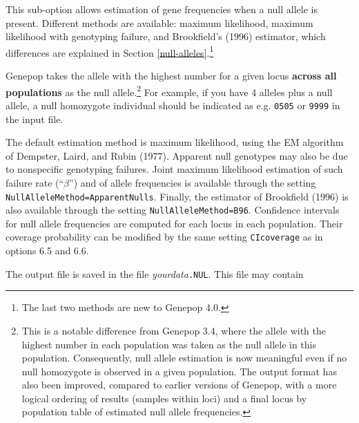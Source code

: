 \documentclass[12pt,]{book}
\let\rmarkdownfootnote\footnote%
\def\footnote{\protect\rmarkdownfootnote}
\begin{document}
 This sub-option allows estimation of gene
frequencies when a null allele is present. Different methods are
available: maximum likelihood, maximum likelihood with genotyping
failure, and Brookfield's (1996) estimator, which differences are
explained in Section \ref{null-alleles}.\footnote{The last two methods
  are new to Genepop 4.0.}

Genepop takes the allele with the highest number for a given locus
\textbf{across all populations} as the null allele.\footnote{This is a
  notable difference from Genepop 3.4, where the allele with the highest
  number in each population was taken as the null allele in this
  population. Consequently, null allele estimation is now meaningful
  even if no null homozygote is observed in a given population. The
  output format has also been improved, compared to earlier versions of
  Genepop, with a more logical ordering of results (samples within loci)
  and a final locus by population table of estimated null allele
  frequencies.} For example, if you have 4 alleles plus a null allele, a
null homozygote individual should be indicated as e.g. \texttt{0505} or
\texttt{9999} in the input file.

The default estimation method is maximum likelihood, using the EM
algorithm of Dempster, Laird, and Rubin (1977). Apparent null genotypes
may also be due to nonspecific genotyping failures. Joint maximum
likelihood estimation of such failure rate (``\(\beta\)'') and of allele
frequencies is available through the setting
\texttt{NullAlleleMethod=ApparentNulls}. Finally, the estimator of
Brookfield (1996) is also available through the setting
\texttt{NullAlleleMethod=B96}. Confidence intervals for null allele frequencies are computed
for each locus in each population. Their coverage probability can be
modified by the same setting \texttt{CIcoverage} as in options 6.5 and
6.6.

The output file is saved in the file \emph{yourdata}\texttt{.NUL}. This
file may contain
\end{document}
